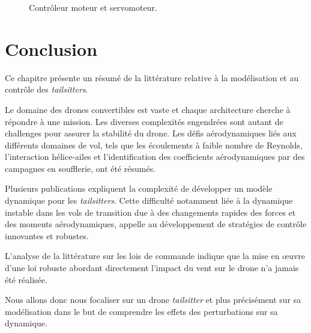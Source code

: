 \begin{figure}[ht!]
    \centering
    \caption{Contrôleur moteur et servomoteur.}
    \label{fig:ESCServo}
\end{figure}




\section{Conclusion}

Ce chapitre présente un résumé de la littérature relative à la modélisation et au contrôle des \textit{tailsitters}.

Le domaine des drones convertibles est vaste et chaque architecture cherche à répondre à une mission. Les diverses complexités engendrées sont autant de challenges pour assurer la stabilité du drone. Les défis aérodynamiques liés aux différents domaines de vol, tels que les écoulements à faible nombre de Reynolds, l'interaction hélice-ailes et l'identification des coefficients aérodynamiques par des campagnes en soufflerie, ont été résumés. 

Plusieurs publications expliquent la complexité de développer un modèle dynamique pour les \textit{tailsitters}. Cette difficulté notamment liée à la dynamique instable dans les vols de transition due à des changements rapides des forces et des moments aérodynamiques, appelle au développement de stratégies de contrôle innovantes et robustes. 

L'analyse de la littérature sur les lois de commande indique que la mise en œuvre d'une loi robuste abordant directement l'impact du vent sur le drone n'a jamais été réalisée.

Nous allons donc nous focaliser sur un drone \textit{tailsitter} et plus précisément sur sa modélisation dans le but de comprendre les effets des perturbations sur sa dynamique.

